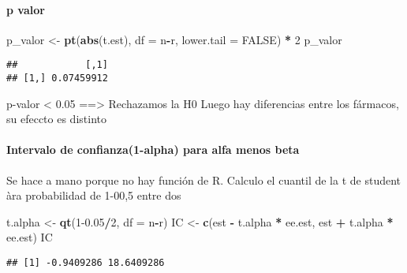 \documentclass[
]{article}
\newenvironment{Shaded}{\begin{snugshade}}{\end{snugshade}}
\newcommand{\AttributeTok}[1]{\textcolor[rgb]{0.13,0.29,0.53}{#1}}
\newcommand{\ConstantTok}[1]{\textcolor[rgb]{0.56,0.35,0.01}{#1}}
\newcommand{\DecValTok}[1]{\textcolor[rgb]{0.00,0.00,0.81}{#1}}
\newcommand{\FloatTok}[1]{\textcolor[rgb]{0.00,0.00,0.81}{#1}}
\newcommand{\FunctionTok}[1]{\textcolor[rgb]{0.13,0.29,0.53}{\textbf{#1}}}
\newcommand{\NormalTok}[1]{#1}
\newcommand{\OtherTok}[1]{\textcolor[rgb]{0.56,0.35,0.01}{#1}}
\newcommand{\SpecialCharTok}[1]{\textcolor[rgb]{0.81,0.36,0.00}{\textbf{#1}}}
\begin{document}
\hypertarget{p-valor}{%
\paragraph{p valor}\label{p-valor}}

\begin{Shaded}
\begin{Highlighting}[]
\NormalTok{p\_valor }\OtherTok{\textless{}{-}} \FunctionTok{pt}\NormalTok{(}\FunctionTok{abs}\NormalTok{(t.est), }\AttributeTok{df =}\NormalTok{ n}\SpecialCharTok{{-}}\NormalTok{r, }\AttributeTok{lower.tail =} \ConstantTok{FALSE}\NormalTok{) }\SpecialCharTok{*} \DecValTok{2}
\NormalTok{p\_valor}
\end{Highlighting}
\end{Shaded}

\begin{verbatim}
##            [,1]
## [1,] 0.07459912
\end{verbatim}

p-valor \textless{} 0.05 ==\textgreater{} Rechazamos la H0 Luego hay
diferencias entre los fármacos, su efeccto es distinto

\hypertarget{intervalo-de-confianza1-alpha-para-alfa-menos-beta}{%
\paragraph{Intervalo de confianza(1-alpha) para alfa menos
beta}\label{intervalo-de-confianza1-alpha-para-alfa-menos-beta}}

Se hace a mano porque no hay función de R. Calculo el cuantil de la t de
student àra probabilidad de 1-00,5 entre dos

\begin{Shaded}
\begin{Highlighting}[]
\NormalTok{t.alpha }\OtherTok{\textless{}{-}} \FunctionTok{qt}\NormalTok{(}\DecValTok{1}\FloatTok{{-}0.05}\SpecialCharTok{/}\DecValTok{2}\NormalTok{, }\AttributeTok{df =}\NormalTok{ n}\SpecialCharTok{{-}}\NormalTok{r)}
\NormalTok{IC }\OtherTok{\textless{}{-}} \FunctionTok{c}\NormalTok{(est }\SpecialCharTok{{-}}\NormalTok{ t.alpha }\SpecialCharTok{*}\NormalTok{ ee.est, est }\SpecialCharTok{+}\NormalTok{ t.alpha }\SpecialCharTok{*}\NormalTok{ ee.est)}
\NormalTok{IC}
\end{Highlighting}
\end{Shaded}

\begin{verbatim}
## [1] -0.9409286 18.6409286
\end{verbatim}
\end{document}

